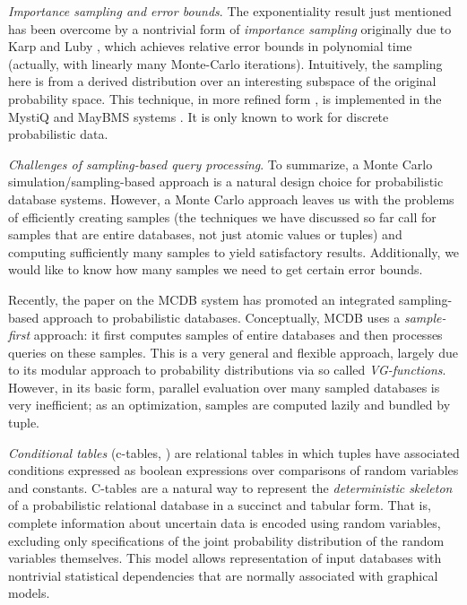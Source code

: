{\em Importance sampling and error bounds}\/.
The exponentiality result just mentioned has been overcome
by a nontrivial form of {\em  importance sampling}\/
originally due to Karp and Luby
\cite{KL1983}, which achieves relative error bounds in polynomial time
(actually, with linearly many Monte-Carlo iterations). Intuitively,
the sampling here is from a derived distribution over an interesting
subspace of the original probability space.
This technique, in more refined form \cite{KLM1989,DKLR2000,Vazirani2001},
is implemented in the MystiQ and MayBMS systems
\cite{RDS07,KO2008,KochMayBMS2008}. It is only known to work for discrete
probabilistic data.



{\em Challenges  of sampling-based query processing}\/.  To  summarize, a
Monte Carlo simulation/sampling-based approach
is  a  natural  design  choice  for  probabilistic  database  systems.
However,  a  Monte Carlo  approach  leaves  us  with the  problems  of
efficiently creating samples (the  techniques we have discussed so far
call for samples that are  entire databases, not just atomic values or
tuples) and computing sufficiently  many samples to yield satisfactory
results.  Additionally, we would like to know how many samples we need to
get certain error bounds.

Recently,  the paper  \cite{MCDB} on  the MCDB  system  has promoted
an integrated  sampling-based  approach to  probabilistic
databases.  Conceptually,  MCDB uses a {\em sample-first}\/ approach:
it   first  computes  samples  of  entire
databases and then processes queries  on these samples.  This is a very
general and flexible approach, largely due to its modular approach to
probability distributions via so called {\em VG-functions}\/.  However,
in its basic form, parallel evaluation over many sampled databases is
very inefficient; as an optimization, samples are computed lazily and
bundled by tuple.  

{\em  Conditional tables}\/  (c-tables, \cite{IL1984})  are relational
tables in which tuples have associated conditions expressed as boolean
expressions over  comparisons of random variables  and constants.
C-tables are a natural way
to  represent  the  {\em  deterministic skeleton}\/  of a probabilistic
relational  database in  a succinct  and tabular  form.  That  is, complete
information  about uncertain data is encoded using random  variables, excluding
only  specifications  of the  joint  probability  distribution of  the
random  variables   themselves.   This  model   allows 
representation of  input databases  with  nontrivial statistical  dependencies
that are normally associated with graphical models.

